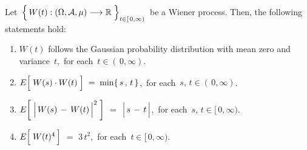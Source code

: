 \vskip 1.0cm
\begin{proposition}
\label{WienerProcessBasicProperties}
\mbox{}
\vskip 0.2cm
\noindent
Let
\,$\left\{\,\overset{{\color{white}.}}{W}(t) : (\Omega,\mathcal{A},\mu) \longrightarrow \Re \;\right\}_{t \in[\,0,\infty)}$\,
be a Wiener process.
Then, the following statements hold:
\begin{enumerate}
\item
	$W(t)$ follows the Gaussian probability distribution with mean zero and variance \,$t$,\,
	for each \,$t \in (\,0,\infty)$.
\item
	$E\!\left[\;\overset{{\color{white}.}}{W(s)} \cdot W(t)\;\right] \; = \; \min\{\,s\,,\,t\,\}$,\,
	for each \,$s,\, t \in (\,0,\infty)$.
\item
	$E\!\left[\;\left\vert\,\overset{{\color{white}.}}{W(s)}\,-\,W(t)\,\right\vert^{2}\;\right]$
	\;$=$\;
	$\left\vert\,s\,\overset{{\color{white}.}}{-}\,t\,\right\vert$,\,
	for each \,$s,\, t \in [\,0,\infty)$.
\item
	$E\!\left[\; W(\overset{{\color{white}.}}{t})^{4} \,\right]$
	\;$=$\;
	$3\,t^{2}$,\,
	for each \,$t \in [\,0,\infty)$.
\end{enumerate}
\end{proposition}
\proof
